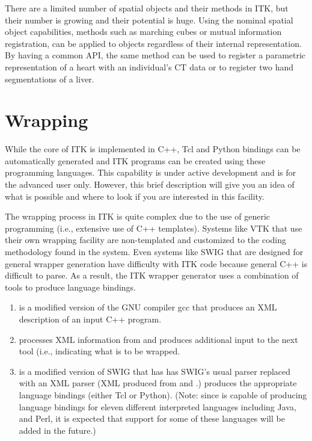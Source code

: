 There are a limited number of spatial objects and their methods in ITK, but
their number is growing and their potential is huge. Using the nominal
spatial object capabilities, methods such as marching cubes or mutual
information registration, can be applied to objects regardless of their
internal representation. By having a common API, the same method can be used
to register a parametric representation of a heart with an individual's CT
data or to register two hand segmentations of a liver.

%
%
%
\section{Wrapping}
\label{sec:Wrapping}

While the core of ITK is implemented in C++, Tcl and Python bindings can be
automatically generated and ITK programs can be created using these
programming languages. This capability is under active development and is for
the advanced user only. However, this brief description will give you an idea
of what is possible and where to look if you are interested in this facility.

The wrapping process in ITK is quite complex due to the use of generic
programming (i.e., extensive use of C++ templates). Systems like VTK that use
their own wrapping facility are non-templated and customized to the coding
methodology found in the system. Even systems like SWIG that are designed
for general wrapper generation have difficulty with ITK code because general
C++ is difficult to parse. As a result, the ITK wrapper generator uses a
combination of tools to produce language bindings.
\begin{enumerate}
  \item {} is a modified version of the GNU compiler gcc that
    produces an XML description of an input C++ program.
  \item  {} processes XML information from  and produces
    additional input to the next tool (i.e.,  indicating what is
    to be wrapped.
  \item {} is a modified version of SWIG that has has SWIG's usual
    parser replaced with an XML parser (XML produced from  and
    .)  produces the appropriate language bindings
    (either Tcl or Python). (Note: since  is capable of producing
    language bindings for eleven different interpreted languages including
    Java, and Perl, it is expected that support for some of these languages
    will be added in the future.)
\end{enumerate}

